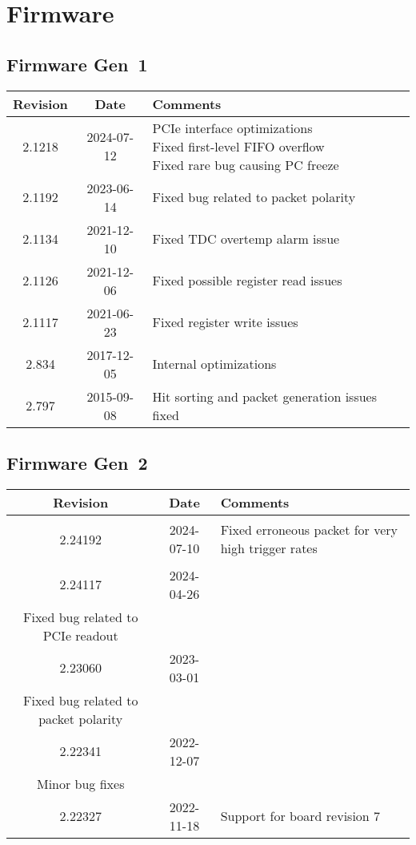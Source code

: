 \section{Firmware}
\subsection{Firmware Gen~1}
\begin{tabularx}{\textwidth}{|c|c|X|}
    \hline
    Revision & Date & Comments\\
    \hline\hline
    2.1218 & 2024-07-12 & \makecell[l]{
        PCIe interface optimizations\\*
        Fixed first-level FIFO overflow\\*
        Fixed rare bug causing PC freeze\\*
    }\\
    \hline
    2.1192 & 2023-06-14 & Fixed bug related to packet polarity\\
    \hline
    2.1134 & 2021-12-10 & Fixed TDC overtemp alarm issue\\
    \hline
    2.1126 & 2021-12-06 & Fixed possible register read issues\\
    \hline
    2.1117 & 2021-06-23 & Fixed register write issues\\
    \hline
    2.834 & 2017-12-05 & Internal optimizations\\
    \hline
    2.797 & 2015-09-08 & Hit sorting and packet generation issues fixed\\
    \hline
\end{tabularx}


\subsection{Firmware Gen~2}
\begin{tabularx}{\textwidth}{|c|c|X|}
    \hline
    Revision & Date & Comments\\
    \hline\hline
    \hypertarget{fwrev}{2.24192} & 2024-07-10 & Fixed erroneous packet for very high trigger rates\\
    \hline
    {2.24117} & 2024-04-26 & \\ Fixed bug related to PCIe readout\\
    \hline
    {2.23060} & 2023-03-01 & \\ Fixed bug related to packet polarity\\
    \hline
    {2.22341} & 2022-12-07 & \\ Minor bug fixes\\
    \hline
    {2.22327} & 2022-11-18 & Support for board revision 7\\
    \hline
\end{tabularx}
